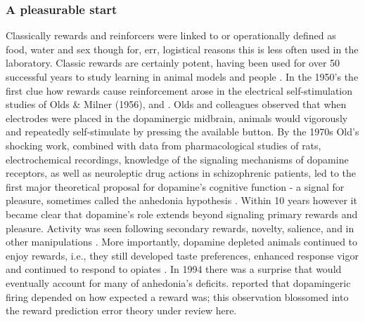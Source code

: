 \subsubsection{A pleasurable start} %
\label{subsub:start}
Classically rewards and reinforcers were linked to or operationally defined as food, water \citep{ODoherty:2006p2875,schultz:2007aa} and sex though for, err, logistical reasons this is less often used in the laboratory.  Classic rewards are certainly potent, having been used for over 50 successful years to study learning in animal models \citep{iversen:2007aa} and people \citep{Kim:2010p7248,Montague:2006mz}.  In the 1950's the first clue how rewards cause reinforcement arose in the electrical self-stimulation studies of Olds \& Milner (1956), and \citet{Crow:1972p8748}.  Olds and colleagues observed that when electrodes were placed in the dopaminergic midbrain, animals would vigorously and repeatedly self-stimulate by pressing the available button.  By the 1970s Old's shocking work, combined with data from pharmacological studies of rats, electrochemical recordings, knowledge of the signaling mechanisms of dopamine receptors, as well as neuroleptic drug actions in schizophrenic patients, led to the first major theoretical proposal for dopamine's cognitive function - a signal for pleasure, sometimes called the anhedonia hypothesis \citep{Wise:1978p8771}.  Within 10 years however it became clear that dopamine's role extends beyond signaling primary rewards and pleasure. Activity was seen following secondary rewards, novelty, salience, and in other manipulations \citep{Spanagel:1999p8515, Salamone:2005p8774, BrombergMartin:2010p8834}.  More importantly, dopamine depleted animals continued to enjoy rewards, i.e., they still developed taste preferences, enhanced response vigor \citep{Cannon:2003p8513} and continued to respond to opiates \citep{Hnasko:2005p8832}.  In 1994 there was a surprise that would eventually account for many of anhedonia's deficits.  \citet{Mirenowicz:1994p7185} reported that dopamingeric firing depended on how expected a reward was; this observation blossomed into the reward prediction error theory under review here.

